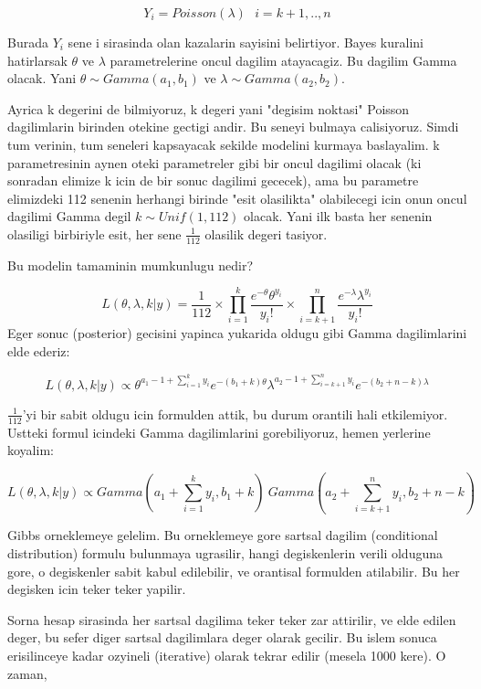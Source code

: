 \documentclass[12pt,fleqn]{article}\usepackage{../common}
\begin{document}
\[ Y_i = Poisson(\lambda) \ \ \ i=k+1,..,n \]

Burada $Y_i$ sene i sirasinda olan kazalarin sayisini belirtiyor. Bayes kuralini
hatirlarsak $\theta$ ve $\lambda$ parametrelerine oncul dagilim atayacagiz. Bu
dagilim Gamma olacak. Yani $\theta \sim Gamma(a_1, b_1)$ ve $\lambda \sim
Gamma(a_2, b_2)$.

Ayrica k degerini de bilmiyoruz, k degeri yani "degisim noktasi" Poisson
dagilimlarin birinden otekine gectigi andir. Bu seneyi bulmaya
calisiyoruz. Simdi tum verinin, tum seneleri kapsayacak sekilde modelini kurmaya
baslayalim. k parametresinin aynen oteki parametreler gibi bir oncul dagilimi
olacak (ki sonradan elimize k icin de bir sonuc dagilimi gececek), ama bu
parametre elimizdeki 112 senenin herhangi birinde "esit olasilikta" olabilecegi
icin onun oncul dagilimi Gamma degil $k \sim Unif(1,112)$ olacak. Yani ilk basta
her senenin olasiligi birbiriyle esit, her sene $\frac{1}{112}$ olasilik degeri
tasiyor.

Bu modelin tamaminin mumkunlugu nedir?

\[ L(\theta, \lambda, k | y) = \frac{1}{112} \times \displaystyle \prod_{i=1}^k
\frac{e^{-\theta}\theta^{y_i}}{y_i!}  \times \displaystyle \prod_{i=k+1}^n
\frac{e^{-\lambda}\lambda^{y_i}}{y_i!} 
 \]
Eger sonuc (posterior) gecisini yapinca yukarida oldugu gibi Gamma dagilimlarini
elde ederiz:

\[ L(\theta, \lambda, k | y)  \propto 
\theta^{a_1-1+\sum_{i=1}^{k} y_i}e^{-(b_1+k)\theta} 
\lambda^{a_2-1+\sum_{i=k+1}^n y_i}e^{-(b_2+n-k)\lambda} 
 \]

$\frac{1}{112}$'yi bir sabit oldugu icin formulden attik, bu durum orantili hali
etkilemiyor. Ustteki formul icindeki Gamma dagilimlarini gorebiliyoruz, hemen
yerlerine koyalim:

\[ L(\theta, \lambda, k | y)  \propto 
Gamma(a_1 + \sum_{i=1}^{k} y_i, b_1+k) \
Gamma(a_2 + \sum_{i=k+1}^{n} y_i, b_2+n-k)
 \]

Gibbs orneklemeye gelelim. Bu orneklemeye gore sartsal dagilim (conditional
distribution) formulu bulunmaya ugrasilir, hangi degiskenlerin verili olduguna
gore, o degiskenler sabit kabul edilebilir, ve orantisal formulden
atilabilir. Bu her degisken icin teker teker yapilir. 

Sorna hesap sirasinda her sartsal dagilima teker teker zar attirilir, ve elde
edilen deger, bu sefer diger sartsal dagilimlara deger olarak gecilir. Bu islem
sonuca erisilinceye kadar ozyineli (iterative) olarak tekrar edilir (mesela 1000
kere). O zaman,
\end{document}
